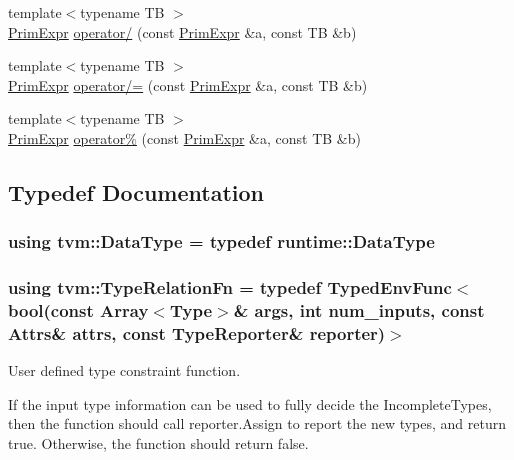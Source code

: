 \begin{DoxyCompactItemize}
{\footnotesize template$<$typename TB $>$ }\\\hyperlink{classtvm_1_1PrimExpr}{Prim\+Expr} \hyperlink{namespacetvm_a136427374941fbf8e50f53b1cab39e38}{operator/} (const \hyperlink{classtvm_1_1PrimExpr}{Prim\+Expr} \&a, const TB \&b)
\item 
{\footnotesize template$<$typename TB $>$ }\\\hyperlink{classtvm_1_1PrimExpr}{Prim\+Expr} \hyperlink{namespacetvm_a51dc569142bf8ce8ea55f73029d3807d}{operator/=} (const \hyperlink{classtvm_1_1PrimExpr}{Prim\+Expr} \&a, const TB \&b)
\item 
{\footnotesize template$<$typename TB $>$ }\\\hyperlink{classtvm_1_1PrimExpr}{Prim\+Expr} \hyperlink{namespacetvm_ab25738e50b37cd07b2d171ca74ba9321}{operator\%} (const \hyperlink{classtvm_1_1PrimExpr}{Prim\+Expr} \&a, const TB \&b)
\end{DoxyCompactItemize}


\subsection{Typedef Documentation}
\subsubsection[{\texorpdfstring{Data\+Type}{DataType}}]{\setlength{\rightskip}{0pt plus 5cm}using {\bf tvm\+::\+Data\+Type} = typedef {\bf runtime\+::\+Data\+Type}}\hypertarget{namespacetvm_a41918af1a1dc386388639a9d3ad06c5d}{}\label{namespacetvm_a41918af1a1dc386388639a9d3ad06c5d}
\subsubsection[{\texorpdfstring{Type\+Relation\+Fn}{TypeRelationFn}}]{\setlength{\rightskip}{0pt plus 5cm}using {\bf tvm\+::\+Type\+Relation\+Fn} = typedef {\bf Typed\+Env\+Func}$<$bool(const {\bf Array}$<${\bf Type}$>$\& args, int num\+\_\+inputs, const {\bf Attrs}\& attrs, const {\bf Type\+Reporter}\& reporter)$>$}\hypertarget{namespacetvm_a72dcba4493adfcd8908663898ece3514}{}\label{namespacetvm_a72dcba4493adfcd8908663898ece3514}


User defined type constraint function. 

If the input type information can be used to fully decide the Incomplete\+Types, then the function should call reporter.\+Assign to report the new types, and return true. Otherwise, the function should return false.


